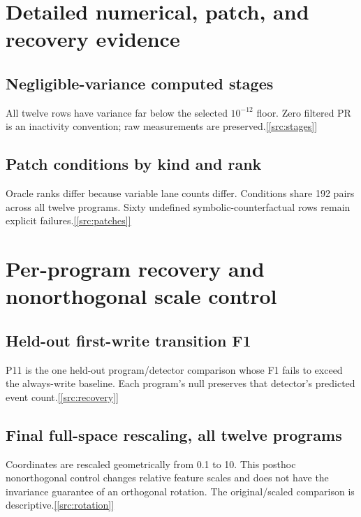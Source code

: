 \documentclass[10pt,a4paper]{article}
\newcommand{\newsection}[1]{\clearpage\section{#1}}
\newcommand{\ev}[1]{\hyperref[src:#1]{[\ref*{src:#1}]}}
\begin{document}
\newsection{Detailed numerical, patch, and recovery evidence}
\subsection*{Negligible-variance computed stages}

All twelve rows have variance far below the selected $10^{-12}$ floor. Zero filtered PR is an inactivity convention; raw measurements are preserved.\ev{stages}

\subsection*{Patch conditions by kind and rank}

Oracle ranks differ because variable lane counts differ. Conditions share 192 pairs across all twelve programs. Sixty undefined symbolic-counterfactual rows remain explicit failures.\ev{patches}

\newsection{Per-program recovery and nonorthogonal scale control}
\subsection*{Held-out first-write transition F1}

P11 is the one held-out program/detector comparison whose F1 fails to exceed the always-write baseline. Each program's null preserves that detector's predicted event count.\ev{recovery}

\subsection*{Final full-space rescaling, all twelve programs}

Coordinates are rescaled geometrically from 0.1 to 10. This posthoc nonorthogonal control changes relative feature scales and does not have the invariance guarantee of an orthogonal rotation. The original/scaled comparison is descriptive.\ev{rotation}
\end{document}
